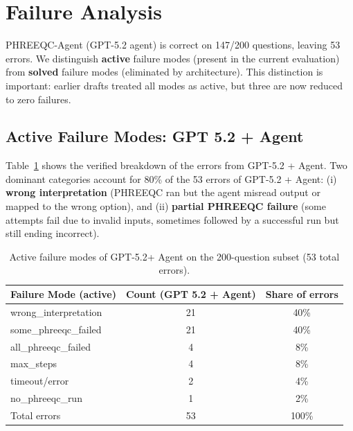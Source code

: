 \documentclass[sigconf,anonymous]{acmart}
\begin{document}
\section{Failure Analysis}
\label{sec:failures}
PHREEQC-Agent (GPT-5.2 agent) is correct on 147/200 questions, leaving 53 errors. We distinguish \textbf{active} failure modes (present in the current evaluation) from \textbf{solved} failure modes (eliminated by architecture). This distinction is important: earlier drafts treated all modes as active, but three are now reduced to zero failures.

\subsection{Active Failure Modes: GPT 5.2 + Agent}
Table~\ref{tab:failure_breakdown} shows the verified breakdown of the errors from GPT-5.2 + Agent. Two dominant categories account for 80\% of the 53 errors of GPT-5.2 + Agent: (i) \textbf{wrong interpretation} (PHREEQC ran but the agent misread output or mapped to the wrong option), and (ii) \textbf{partial PHREEQC failure} (some attempts fail due to invalid inputs, sometimes followed by a successful run but still ending incorrect). 

\begin{table}[t]
\centering
\small
\begin{tabular}{lcc}
\toprule
Failure Mode (active) & Count (GPT 5.2 + Agent) & Share of errors \\
\midrule
wrong\_interpretation & 21 & 40\% \\
some\_phreeqc\_failed & 21 & 40\% \\
all\_phreeqc\_failed & 4 & 8\% \\
max\_steps & 4 & 8\% \\
timeout/error & 2 & 4\% \\
no\_phreeqc\_run & 1 & 2\% \\
\midrule
Total errors & 53 & 100\% \\
\bottomrule
\end{tabular}
\caption{Active failure modes of GPT-5.2+ Agent on the 200-question subset (53 total errors).}
\label{tab:failure_breakdown}
\end{table}
\end{document}
